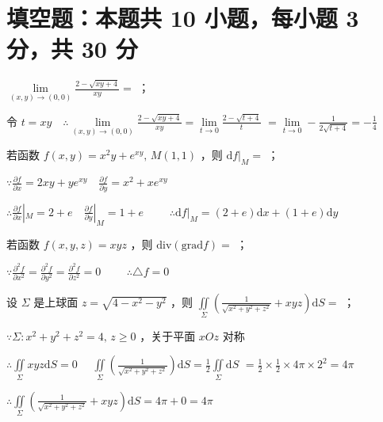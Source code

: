 
\section{填空题：本题共 10 小题，每小题 3 分，共 30 分}

\begin{question}[points = 3]
    $\lim\limits_{(x, y) \to (0, 0)} \frac{2 - \sqrt{xy + 4}}{xy} = $ \fillin[$-\frac{1}{4}$]；
\end{question}
\begin{solution}
    令 $t = xy \quad \therefore \lim\limits_{(x, y) \to (0, 0)} \frac{2 - \sqrt{xy + 4}}{xy} = \lim\limits_{t \to 0} \frac{2 - \sqrt{t + 4}}{t}$
    $= \lim\limits_{t \to 0} -\frac{1}{2\sqrt{t + 4}} = -\frac{1}{4}$
\end{solution}

\begin{question}[points = 3]
    若函数 $f(x, y) = x^2y + e^{xy},\, M(1,1)$ ，则 $\mathrm{d}f|_M = $ ；
\end{question}
\begin{solution}
    $\because \frac{\partial f}{\partial x} = 2xy + ye^{xy} \quad \frac{\partial f}{\partial y} = x^2 + xe^{xy}$

    $\therefore \frac{\partial f}{\partial x}|_M = 2 + e \quad \frac{\partial f}{\partial y}|_M = 1 + e \qquad$
    $\therefore \mathrm{d}f|_M = (2 + e)\mathrm{d}x + (1 + e)\mathrm{d}y$
\end{solution}

\begin{question}[points = 3]
    若函数 $f(x, y, z) = xyz$ ，则 $\mathrm{div}(\mathrm{grad}f) = $ \fillin[$0$]；
\end{question}
\begin{solution}
    $\because \frac{\partial^2 f}{\partial x^2} = \frac{\partial^2 f}{\partial y^2} = \frac{\partial^2 f}{\partial z^2} = 0 \qquad$
    $\therefore \triangle f = 0$
\end{solution}

\begin{question}[points = 3]
    设 $\Sigma$ 是上球面 $z = \sqrt{4 - x^2 - y^2}$ ，则
    $\iint\limits_\Sigma \left(\frac{1}{\sqrt{x^2 + y^2 + z^2}} + xyz\right)\mathrm{d}S = $ \fillin[$4\pi$]；
\end{question}
\begin{solution}
    $\because \Sigma: x^2 + y^2 + z^2 = 4,\, z \geq 0$ ，关于平面 $xOz$ 对称

    $\therefore \iint\limits_\Sigma xyz\mathrm{d}S = 0 \quad$
    $\iint\limits_\Sigma \left(\frac{1}{\sqrt{x^2 + y^2 + z^2}}\right)\mathrm{d}S = \frac{1}{2} \iint\limits_\Sigma\mathrm{d}S$
    $= \frac{1}{2} \times \frac{1}{2} \times 4\pi \times 2^2 = 4\pi$

    $\therefore \iint\limits_\Sigma \left(\frac{1}{\sqrt{x^2 + y^2 + z^2}} + xyz\right)\mathrm{d}S = 4\pi + 0 = 4\pi$
\end{solution}

